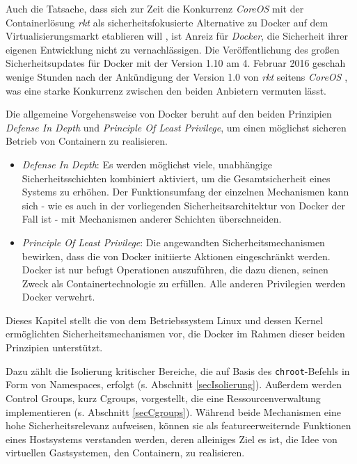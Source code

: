 \documentclass[../main.tex]{subfiles}
\begin{document}
	Auch die Tatsache, dass sich zur Zeit die Konkurrenz \emph{CoreOS} mit der Containerlösung \emph{rkt} als sicherheitsfokusierte Alternative zu Docker auf dem Virtualisierungsmarkt etablieren will \cite{coreosAnnouncementRkt10}, ist Anreiz für \emph{Docker}, die Sicherheit ihrer eigenen Entwicklung nicht zu vernachlässigen. Die Veröffentlichung des großen Sicherheitsupdates für Docker mit der Version 1.10 am 4. Februar 2016 geschah wenige Stunden nach der Ankündigung der Version 1.0 von \emph{rkt} seitens \emph{CoreOS} \cite{hnAnnouncementDocker110}\cite{hnAnnouncementRkt10}, was eine starke Konkurrenz zwischen den beiden Anbietern vermuten lässt. %

	Die allgemeine Vorgehensweise von Docker beruht auf den beiden Prinzipien \emph{Defense In Depth} und \emph{Principle Of Least Privilege}, um einen möglichst sicheren Betrieb von Containern zu realisieren.

	\begin{itemize}
			\item \emph{Defense In Depth}: Es werden möglichst viele, unabhängige Sicherheitsschichten kombiniert aktiviert, um die Gesamtsicherheit eines Systems zu erhöhen. Der Funktionsumfang der einzelnen Mechanismen kann sich - wie es auch in der vorliegenden Sicherheitsarchitektur von Docker der Fall ist - mit Mechanismen anderer Schichten überschneiden.
			\item \emph{Principle Of Least Privilege}: Die angewandten Sicherheitsmechanismen bewirken, dass die von Docker initiierte Aktionen eingeschränkt werden. Docker ist nur befugt Operationen auszuführen, die dazu dienen, seinen Zweck als Containertechnologie zu erfüllen. Alle anderen Privilegien werden Docker verwehrt.
	\end{itemize}


	Dieses Kapitel stellt die von dem Betriebssystem Linux und dessen Kernel ermöglichten Sicherheitsmechanismen vor, die Docker im Rahmen dieser beiden Prinzipien unterstützt.

	Dazu zählt die Isolierung kritischer Bereiche, die auf Basis des \texttt{chroot}-Befehls in Form von Namespaces, erfolgt (s. Abschnitt \ref{secIsolierung}). Außerdem werden Control Groups, kurz Cgroups, vorgestellt, die eine Ressourcenverwaltung implementieren (s. Abschnitt \ref{secCgroups}). Während beide Mechanismen eine hohe Sicherheitsrelevanz aufweisen, können sie als featureerweiternde Funktionen eines Hostsystems verstanden werden, deren alleiniges Ziel es ist, die Idee von virtuellen Gastsystemen, den Containern, zu realisieren. %
\end{document}
